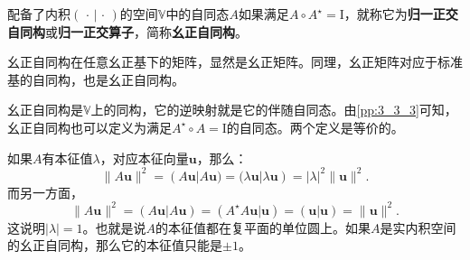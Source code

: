 \documentclass[12pt,UTF8]{ctexbook}
\begin{document}
\begin{df}\label{df:8_1}
配备了内积$(\,\cdot\, | \,\cdot\,)$的空间$\mathbb{V}$中的自同态$A$如果满足$A\circ A^\star = \mathrm{I}$，就称它为\textbf{归一正交自同构}或\textbf{归一正交算子}，简称\textbf{幺正自同构}。
\end{df}
幺正自同构在任意幺正基下的矩阵，显然是幺正矩阵。同理，幺正矩阵对应于标准基的自同构，也是幺正自同构。

幺正自同构是$\mathbb{V}$上的同构，它的逆映射就是它的伴随自同态。由\ref{pp:3_3_3}可知，幺正自同构也可以定义为满足$A^\star\circ A = \mathrm{I}$的自同态。两个定义是等价的。

如果$A$有本征值$\lambda$，对应本征向量$\mathbf{u}$，那么：
$$ \| A\mathbf{u}\|^2 = (A\mathbf{u}|A\mathbf{u}) = (\lambda\mathbf{u}| \lambda\mathbf{u}) = |\lambda|^2 \|\mathbf{u}\|^2. $$
而另一方面，
$$ \| A\mathbf{u}\|^2 = (A\mathbf{u}|A\mathbf{u}) = (A^\star A\mathbf{u}|\mathbf{u}) = (\mathbf{u}|\mathbf{u}) = \|\mathbf{u}\|^2. $$
这说明$|\lambda| = 1$。也就是说$A$的本征值都在复平面的单位圆上。如果$A$是实内积空间的幺正自同构，那么它的本征值只能是$\pm 1$。
\end{document}
